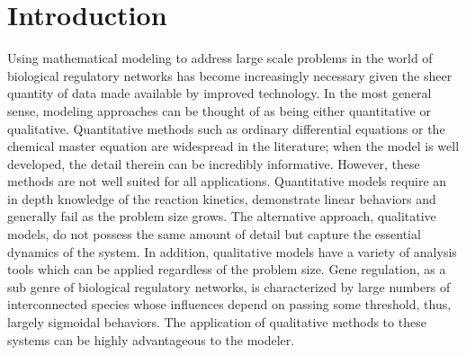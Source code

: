 \documentclass{article}
\begin{document}
\section{Introduction}
Using mathematical modeling to address large scale problems in the world of biological regulatory networks has become increasingly necessary given the sheer quantity of data made available by improved technology. In the most general sense, modeling approaches can be thought of as being either quantitative or qualitative. Quantitative methods such as ordinary differential equations or the chemical master equation are widespread in the literature; when the model is well developed, the detail therein can be incredibly informative. However, these methods are not well suited for all applications. Quantitative models require an in depth knowledge of the reaction kinetics, demonstrate linear behaviors and generally fail as the problem size grows. The alternative approach, qualitative models, do not possess the same amount of detail but capture the essential dynamics of the system. In addition, qualitative models have a variety of analysis tools which can be applied regardless of the problem size. Gene regulation, as a sub genre of biological regulatory networks, is characterized by large numbers of interconnected species whose influences depend on passing some threshold, thus, largely sigmoidal behaviors. The application of qualitative methods to these systems can be highly advantageous to the modeler.\\
\end{document}
